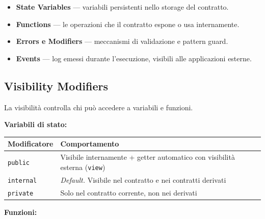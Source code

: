 \documentclass[
  italian,
  openany]{book}
\newcounter{none} %
\providecommand{\tightlist}{%
  \setlength{\itemsep}{0pt}\setlength{\parskip}{0pt}}
\begin{document}
\begin{itemize}
\tightlist
\item
  \textbf{State Variables} --- variabili persistenti nello storage del
  contratto.
\item
  \textbf{Functions} --- le operazioni che il contratto espone o usa
  internamente.
\item
  \textbf{Errors e Modifiers} --- meccanismi di validazione e pattern
  guard.
\item
  \textbf{Events} --- log emessi durante l'esecuzione, visibili alle
  applicazioni esterne.
\end{itemize}

\subsection{Visibility Modifiers}\label{visibility-modifiers}

La visibilità controlla chi può accedere a variabili e funzioni.

\textbf{Variabili di stato:}

{\def\LTcaptype{none} %
\begin{longtable}[]{@{}
  >{\raggedright\arraybackslash}p{}
  >{\raggedright\arraybackslash}p{}@{}}
\toprule\noalign{}
\begin{minipage}[b]{\linewidth}\raggedright
Modificatore
\end{minipage} & \begin{minipage}[b]{\linewidth}\raggedright
Comportamento
\end{minipage} \\
\midrule\noalign{}
\endhead
\bottomrule\noalign{}
\endlastfoot
\texttt{public} & Visibile internamente + getter automatico con
visibilità esterna (\texttt{view}) \\
\texttt{internal} & \emph{Default.} Visibile nel contratto e nei
contratti derivati \\
\texttt{private} & Solo nel contratto corrente, non nei derivati \\
\end{longtable}
}

\textbf{Funzioni:}
\end{document}
